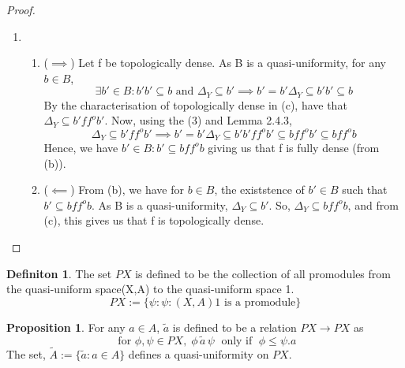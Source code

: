 \documentclass[18pt,a4paper]{article}
\makeatletter
\theoremstyle{definition}
\newtheorem{definition}[theorem]{Definiton}
\newtheorem{proop}[theorem]{Proposition}
\newcommand{\carrow}{}%
\DeclareRobustCommand{\carrow}{%
	\mathrel{\vphantom{\rightarrow}\mathpalette\circle@arrow\relax}%
}
\newcommand{\circle@arrow}[2]{%
	\m@th
	\ooalign{%
		\hidewidth$#1\circ\mkern1mu$\hidewidth\cr
	$#1\longrightarrow$\cr}%
}
\makeatother
\begin{document}
\begin{proof}
\begin{enumerate}[label=(\alph*)]
\item \begin{enumerate}[label=(\roman*)]
	\item
			($\implies $) Let f be topologically dense. As B is a quasi-uniformity, for any $b \in B$,
			\begin{equation}\exists b' \in B : b'b' \subseteq b \text{ and } \Delta_Y \subseteq b'
				\implies b'=b'\Delta_Y \subseteq b'b' \subseteq b
			\end{equation}
			By the characterisation of topologically dense in (c), have that $\Delta_Y \subseteq b'f f^o b'$.
			Now, using the (3) and Lemma 2.4.3,
			\[ \Delta_Y \subseteq b'f f^o b' \implies b'=b'\Delta_Y \subseteq b'b'f f^o b' \subseteq bf f^o b'
			\subseteq bf f^o b\]
			Hence, we have $b'\in B : b' \subseteq bf f^o b$ giving us that f is fully dense (from (b)).
		\item ($\impliedby$) From (b), we have for $b \in B$, the existstence of $b' \in B$ such that $
			b' \subseteq bf f^o b$. As B is a quasi-uniformity, $\Delta_Y \subseteq b'$. So,
			$\Delta_Y \subseteq bf f^o b$, and from (c), this gives us that f is topologically dense.
	\end{enumerate}
\end{enumerate}
\end{proof}
\begin{definition}%
	The set $PX$ is defined to be the collection of all promodules from the quasi-uniform space(X,A)
	to the quasi-uniform space 1.
	\[PX:=\{\psi : \psi:(X,A) \carrow 1 \text{ is a promodule} \}\]
\end{definition}
\begin{proop}%
	For any $a\in A$, $$ is defined to be a relation $PX \to PX$ as
	\[ \text{ for } \phi,\psi \in PX, \; \phi \, \tilde{a} \, \psi \; \text{ only if } \;
	\phi \leq \psi.a \]
	The set, $:=\{:a \in A\}$ defines a quasi-uniformity on $PX$.
\end{proop}
\end{document}
